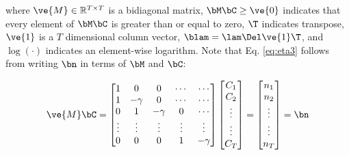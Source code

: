 \noindent where $\ve{M} \in \mathbb{R}^{T \times T}$ is a bidiagonal matrix, $\bM \bC \geq \ve{0}$ indicates that every element of $\bM \bC$ is greater than or equal to zero, $\T$ indicates transpose, $\ve{1}$ is a $T$ dimensional column vector, $\blam=\lam \Del \ve{1}\T$, and $\log(\cdot)$ indicates an element-wise logarithm.  Note that Eq. \eqref{eq:eta3} follows from writing $\bn$ in terms of $\bM$ and $\bC$:
 

\begin{align} \label{eq:M}
\ve{M} \bC = %
\begin{bmatrix}
1 & 0  & 0 & \cdots & \cdots \\
1 & -\gamma & 0 & \cdots & \cdots \\
0 & 1 & -\gamma & 0 & \cdots  \\
\vdots & \vdots & \vdots & \vdots & \vdots  \\
0 & 0 & 0 & 1 & -\gamma
\end{bmatrix}
\begin{bmatrix}
C_1 \\ C_2 \\ \vdots \\ \vdots \\ C_T  
\end{bmatrix}
= 
\begin{bmatrix}
n_1 \\ n_2 \\ \vdots \\ \vdots \\ n_T
\end{bmatrix}
= \bn
\end{align}

